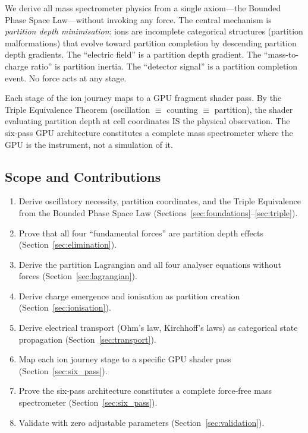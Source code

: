 \documentclass[11pt,twocolumn,a4paper]{article}
\theoremstyle{definition}
\theoremstyle{remark}
\begin{document}
We derive all mass spectrometer physics from a single axiom---the Bounded Phase Space Law---without invoking any force. The central mechanism is \emph{partition depth minimisation}: ions are incomplete categorical structures (partition malformations) that evolve toward partition completion by descending partition depth gradients. The ``electric field'' is a partition depth gradient. The ``mass-to-charge ratio'' is partition inertia. The ``detector signal'' is a partition completion event. No force acts at any stage.

Each stage of the ion journey maps to a GPU fragment shader pass. By the Triple Equivalence Theorem (oscillation $\equiv$ counting $\equiv$ partition), the shader evaluating partition depth at cell coordinates IS the physical observation. The six-pass GPU architecture constitutes a complete mass spectrometer where the GPU is the instrument, not a simulation of it.

\subsection{Scope and Contributions}

\begin{enumerate}[nosep]
\item Derive oscillatory necessity, partition coordinates, and the Triple Equivalence from the Bounded Phase Space Law (Sections~\ref{sec:foundations}--\ref{sec:triple}).
\item Prove that all four ``fundamental forces'' are partition depth effects (Section~\ref{sec:elimination}).
\item Derive the partition Lagrangian and all four analyser equations without forces (Section~\ref{sec:lagrangian}).
\item Derive charge emergence and ionisation as partition creation (Section~\ref{sec:ionisation}).
\item Derive electrical transport (Ohm's law, Kirchhoff's laws) as categorical state propagation (Section~\ref{sec:transport}).
\item Map each ion journey stage to a specific GPU shader pass (Section~\ref{sec:six_pass}).
\item Prove the six-pass architecture constitutes a complete force-free mass spectrometer (Section~\ref{sec:six_pass}).
\item Validate with zero adjustable parameters (Section~\ref{sec:validation}).
\end{enumerate}
\end{document}
